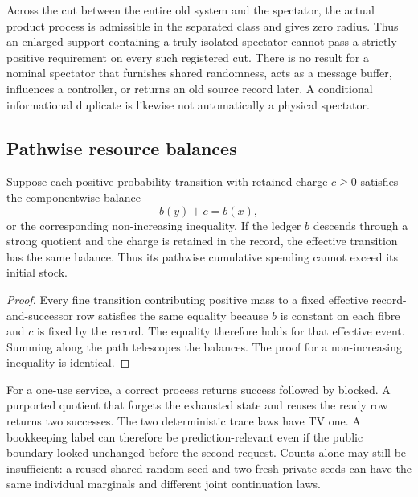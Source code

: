 Across the cut between the entire old system and the spectator, the actual product process is admissible in the separated class and gives zero radius. Thus an enlarged support containing a truly isolated spectator cannot pass a strictly positive requirement on every such registered cut. There is no result for a nominal spectator that furnishes shared randomness, acts as a message buffer, influences a controller, or returns an old source record later. A conditional informational duplicate is likewise not automatically a physical spectator.

\subsection{Pathwise resource balances}
\begin{proposition}\label{p2-24}
Suppose each positive-probability transition with retained charge \(c\ge0\) satisfies the componentwise balance
\begin{equation}\label{eq:resource-balance}
 b(y)+c=b(x),
\end{equation}
or the corresponding non-increasing inequality. If the ledger \(b\) descends through a strong quotient and the charge is retained in the record, the effective transition has the same balance. Thus its pathwise cumulative spending cannot exceed its initial stock.
\end{proposition}
\begin{proof}
Every fine transition contributing positive mass to a fixed effective record-and-successor row satisfies the same equality because \(b\) is constant on each fibre and \(c\) is fixed by the record. The equality therefore holds for that effective event. Summing along the path telescopes the balances. The proof for a non-increasing inequality is identical.
\end{proof}
For a one-use service, a correct process returns success followed by blocked. A purported quotient that forgets the exhausted state and reuses the ready row returns two successes. The two deterministic trace laws have TV one. A bookkeeping label can therefore be prediction-relevant even if the public boundary looked unchanged before the second request. Counts alone may still be insufficient: a reused shared random seed and two fresh private seeds can have the same individual marginals and different joint continuation laws.

